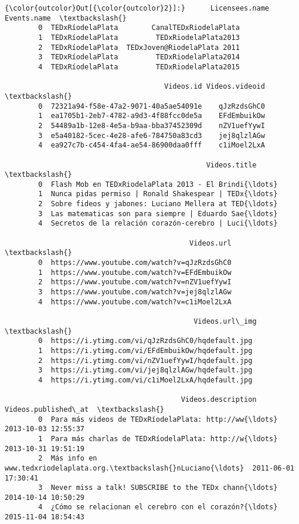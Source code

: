 \documentclass[11pt]{article}
\begin{document}
\begin{Verbatim}[commandchars=\\\{\}]
{\color{outcolor}Out[{\color{outcolor}2}]:}      Licensees.name                  Events.name  \textbackslash{}
        0  TEDxRíodelaPlata        CanalTEDxRiodelaPlata   
        1  TEDxRíodelaPlata         TEDxRiodelaPlata2013   
        2  TEDxRíodelaPlata  TEDxJoven@RiodelaPlata 2011   
        3  TEDxRíodelaPlata         TEDxRiodelaPlata2014   
        4  TEDxRíodelaPlata         TEDxRiodelaPlata2015   
        
                                      Videos.id Videos.videoid  \textbackslash{}
        0  72321a94-f58e-47a2-9071-40a5ae54091e    qJzRzdsGhC0   
        1  ea1705b1-2eb7-4782-a9d3-4f88fcc0de5a    EFdEmbuikOw   
        2  54489a1b-12e8-4e5a-b9aa-bba37452309d    nZV1uefYywI   
        3  e5a40182-5cec-4e28-afe6-784750a83cd3    jej8qlzlAGw   
        4  ea927c7b-c454-4fa4-ae54-86900daa0fff    c1iMoel2LxA   
        
                                                Videos.title  \textbackslash{}
        0  Flash Mob en TEDxRiodelaPlata 2013 - El Brindi{\ldots}   
        1  Nunca pidas permiso | Ronald Shakespear | TEDx{\ldots}   
        2  Sobre fideos y jabones: Luciano Mellera at TED{\ldots}   
        3  Las matematicas son para siempre | Eduardo Sae{\ldots}   
        4  Secretos de la relación corazón-cerebro | Luci{\ldots}   
        
                                            Videos.url  \textbackslash{}
        0  https://www.youtube.com/watch?v=qJzRzdsGhC0   
        1  https://www.youtube.com/watch?v=EFdEmbuikOw   
        2  https://www.youtube.com/watch?v=nZV1uefYywI   
        3  https://www.youtube.com/watch?v=jej8qlzlAGw   
        4  https://www.youtube.com/watch?v=c1iMoel2LxA   
        
                                             Videos.url\_img  \textbackslash{}
        0  https://i.ytimg.com/vi/qJzRzdsGhC0/hqdefault.jpg   
        1  https://i.ytimg.com/vi/EFdEmbuikOw/hqdefault.jpg   
        2  https://i.ytimg.com/vi/nZV1uefYywI/hqdefault.jpg   
        3  https://i.ytimg.com/vi/jej8qlzlAGw/hqdefault.jpg   
        4  https://i.ytimg.com/vi/c1iMoel2LxA/hqdefault.jpg   
        
                                          Videos.description  Videos.published\_at  \textbackslash{}
        0  Para más videos de TEDxRíodelaPlata: http://ww{\ldots}  2013-10-03 12:55:37   
        1  Para más charlas de TEDxRíodelaPlata: http://w{\ldots}  2013-10-31 19:51:19   
        2  Más info en www.tedxriodelaplata.org.\textbackslash{}nLuciano{\ldots}  2011-06-01 17:30:41   
        3  Never miss a talk! SUBSCRIBE to the TEDx chann{\ldots}  2014-10-14 10:50:29   
        4  ¿Cómo se relacionan el cerebro con el corazón?{\ldots}  2015-11-04 18:54:43   
        

\end{Verbatim}
\end{document}
